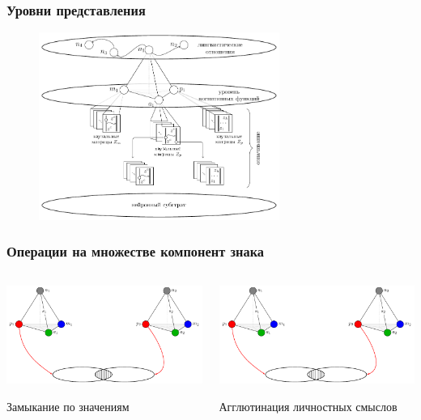\documentclass[default]{beamer}
\begin{document}
					
	\begin{frame}
		\frametitle{Уровни представления}
		
		\begin{figure}
			\includegraphics[width=0.7\textwidth]{signs/sign_levels}
		\end{figure}
	\end{frame}	

	\begin{frame}
		\frametitle{Операции на множестве компонент знака}
		
		\begin{columns}
			\begin{column}{0.5\textwidth}
				\centering
				\includegraphics[page=7,width=\textwidth]{signs/sign_relations}
				\par\bigskip
				Замыкание по значениям
			\end{column}
			\begin{column}{0.5\textwidth}
				\centering
				\includegraphics[page=8,width=\textwidth]{signs/sign_relations}
				\par\bigskip
				Агглютинация личностных смыслов
			\end{column}
		\end{columns}
	\end{frame}	
	
\end{document}
